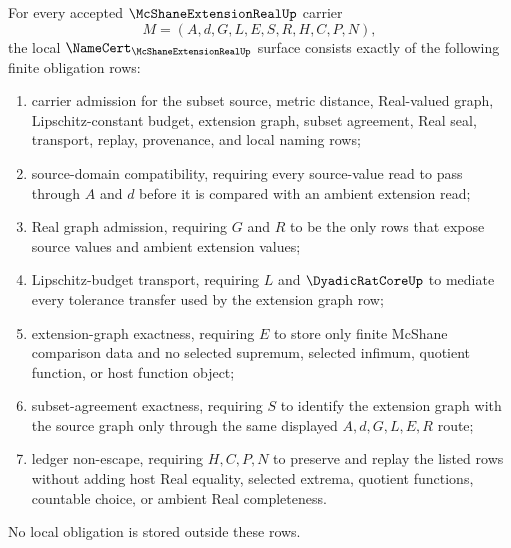 \begin{theorem}
\label{thm:mcshane-extension-real-namecert-obligations}
For every accepted $\McShaneExtensionRealUp$ carrier
$$
M=(A,d,G,L,E,S,R,H,C,P,N),
$$
the local $\NameCert_{\McShaneExtensionRealUp}$ surface consists exactly of the following finite obligation rows:
\begin{enumerate}
\item carrier admission for the subset source, metric distance, Real-valued graph, Lipschitz-constant budget, extension graph, subset agreement, Real seal, transport, replay, provenance, and local naming rows;
\item source-domain compatibility, requiring every source-value read to pass through $A$ and $d$ before it is compared with an ambient extension read;
\item Real graph admission, requiring $G$ and $R$ to be the only rows that expose source values and ambient extension values;
\item Lipschitz-budget transport, requiring $L$ and $\DyadicRatCoreUp$ to mediate every tolerance transfer used by the extension graph row;
\item extension-graph exactness, requiring $E$ to store only finite McShane comparison data and no selected supremum, selected infimum, quotient function, or host function object;
\item subset-agreement exactness, requiring $S$ to identify the extension graph with the source graph only through the same displayed $A,d,G,L,E,R$ route;
\item ledger non-escape, requiring $H,C,P,N$ to preserve and replay the listed rows without adding host Real equality, selected extrema, quotient functions, countable choice, or ambient Real completeness.
\end{enumerate}
No local obligation is stored outside these rows.
\end{theorem}
